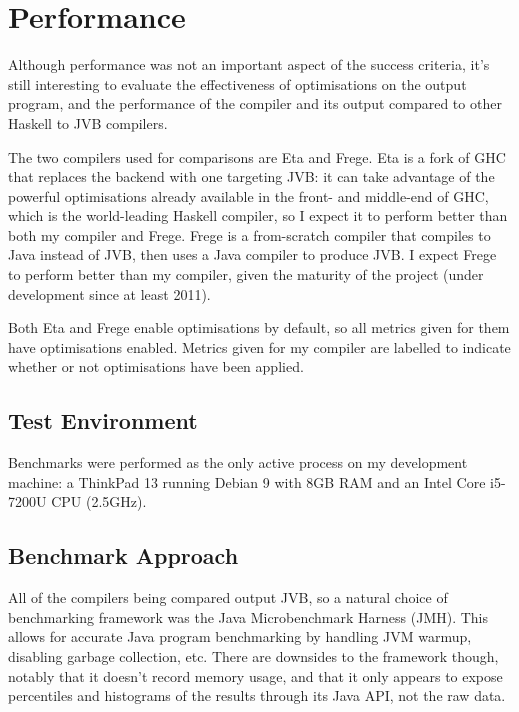 \documentclass[dissertation.tex]{subfiles}
\begin{document}
\section{Performance}
{

    Although performance was not an important aspect of the success criteria, it's still interesting to evaluate the
    effectiveness of optimisations on the output program, and the performance of the compiler and its output compared to
    other Haskell to JVB compilers.

    The two compilers used for comparisons are Eta and Frege. Eta is a fork of GHC that replaces the backend with one
    targeting JVB: it can take advantage of the powerful optimisations already available in the front- and middle-end of
    GHC, which is the world-leading Haskell compiler, so I expect it to perform better than both my compiler and Frege.
    Frege is a from-scratch compiler that compiles to Java instead of JVB, then uses a Java compiler to produce JVB. I
    expect Frege to perform better than my compiler, given the maturity of the project (under development since at least
    2011).

    Both Eta and Frege enable optimisations by default, so all metrics given for them have optimisations enabled.
    Metrics given for my compiler are labelled to indicate whether or not optimisations have been applied.

    \subsection{Test Environment}\label{sec:test-environment}
    {

        Benchmarks were performed as the only active process on my development machine: a ThinkPad 13 running Debian 9
        with 8GB RAM and an Intel Core i5-7200U CPU (2.5GHz).

    }
    \subsection{Benchmark Approach}
    {

        All of the compilers being compared output JVB, so a natural choice of benchmarking framework was the Java
        Microbenchmark Harness (JMH). This allows for accurate Java program benchmarking by handling JVM
        warmup, disabling garbage collection, etc. There are downsides to the framework though, notably that it doesn't
        record memory usage, and that it only appears to expose percentiles and histograms of the results through its
        Java API, not the raw data.

}}
\end{document}
